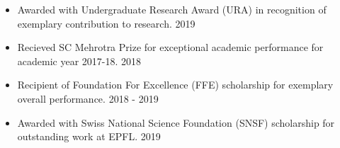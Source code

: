 
\begin{itemize}
    \setlength\itemsep{0.7mm}
    \item Awarded with Undergraduate Research Award (URA) in recognition of exemplary contribution to research. \hfill {2019}
    \item Recieved SC Mehrotra Prize for exceptional academic performance for academic year 2017-18. \hfill {2018}
    \item Recipient of Foundation For Excellence (FFE) scholarship for exemplary overall performance. \hfill {2018 - 2019}
    \item Awarded with Swiss National Science Foundation (SNSF) scholarship for outstanding work at EPFL. \hfill{2019}
\end{itemize}